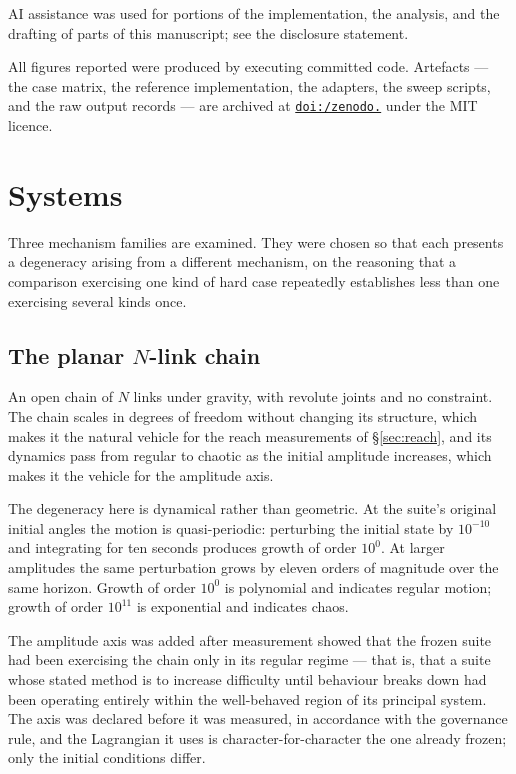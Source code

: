 \documentclass[review,12pt]{elsarticle}
\begin{document}
AI assistance was used for portions of the implementation, the analysis, and the
drafting of parts of this manuscript; see the
disclosure statement.

All figures reported were produced by executing committed code. Artefacts ---
the case matrix, the reference implementation, the adapters, the sweep scripts,
and the raw output records --- are archived at
\href{https://doi.org/10.5281/zenodo.22315172}{\texttt{doi:/\allowbreak zenodo.}}
under the MIT licence.

\section{Systems}

Three mechanism families are examined. They were chosen so that each presents a
degeneracy arising from a different mechanism, on the reasoning that a
comparison exercising one kind of hard case repeatedly establishes less than one
exercising several kinds once.

\subsection{The planar \texorpdfstring{$N$}{N}-link chain}
An open chain of $N$ links under gravity, with revolute joints and no
constraint. The chain scales in degrees of freedom without changing its
structure, which makes it the natural vehicle for the reach measurements of
\S\ref{sec:reach}, and its dynamics pass from regular to chaotic as the initial
amplitude increases, which makes it the vehicle for the amplitude axis.

The degeneracy here is dynamical rather than geometric. At the suite's original
initial angles the motion is quasi-periodic: perturbing the initial state by
$10^{-10}$ and integrating for ten seconds produces growth of order $10^{0}$. At
larger amplitudes the same perturbation grows by eleven orders of magnitude over
the same horizon. Growth of order $10^{0}$ is polynomial and indicates regular
motion; growth of order $10^{11}$ is exponential and indicates chaos.

The amplitude axis was added after measurement showed that the frozen suite had
been exercising the chain only in its regular regime --- that is, that a suite
whose stated method is to increase difficulty until behaviour breaks down had
been operating entirely within the well-behaved region of its principal system.
The axis was declared before it was measured, in accordance with the governance
rule, and the Lagrangian it uses is character-for-character the one already
frozen; only the initial conditions differ.
\end{document}
